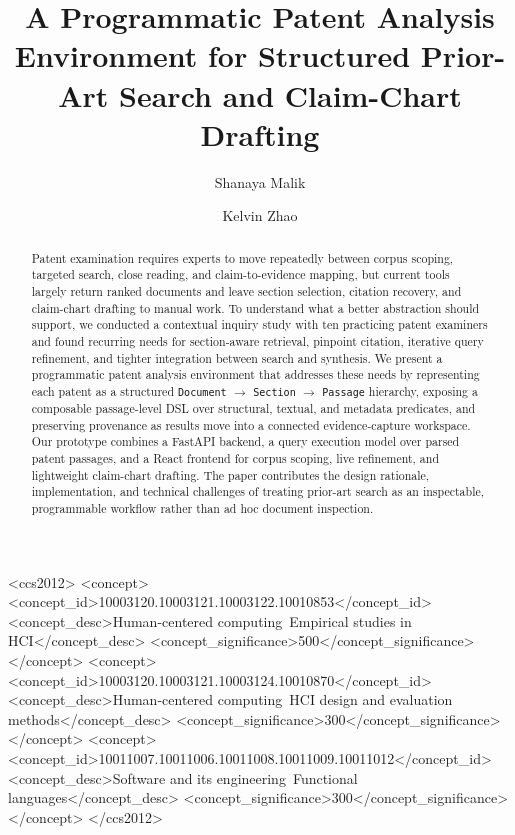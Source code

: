 \documentclass[sigconf]{acmart}
\newcommand{\DocSectionPassage}{\texttt{Document} $\to$ \texttt{Section} $\to$ \texttt{Passage}}
\begin{document}
\title{A Programmatic Patent Analysis Environment for Structured Prior-Art Search and Claim-Chart Drafting}

\author{Shanaya Malik}

\author{Kelvin Zhao}

\renewcommand{\shortauthors}{Malik \& Zhao}

\begin{abstract}
Patent examination requires experts to move repeatedly between corpus scoping,
targeted search, close reading, and claim-to-evidence mapping, but current
tools largely return ranked documents and leave section selection, citation
recovery, and claim-chart drafting to manual work. To understand what a better
abstraction should support, we conducted a contextual inquiry study with ten
practicing patent examiners and found recurring needs for section-aware
retrieval, pinpoint citation, iterative query refinement, and tighter
integration between search and synthesis. We present a programmatic patent
analysis environment that addresses these needs by representing each patent as
a structured \DocSectionPassage{} hierarchy,
exposing a composable passage-level DSL over structural, textual, and metadata
predicates, and preserving provenance as results move into a connected
evidence-capture workspace. Our prototype combines a FastAPI backend, a query
execution model over parsed patent passages, and a React frontend for corpus
scoping, live refinement, and lightweight claim-chart drafting. The paper
contributes the design rationale, implementation, and technical challenges of
treating prior-art search as an inspectable, programmable workflow rather than
ad hoc document inspection.
\end{abstract}

\begin{CCSXML}
<ccs2012>
 <concept>
  <concept_id>10003120.10003121.10003122.10010853</concept_id>
  <concept_desc>Human-centered computing~Empirical studies in HCI</concept_desc>
  <concept_significance>500</concept_significance>
 </concept>
 <concept>
  <concept_id>10003120.10003121.10003124.10010870</concept_id>
  <concept_desc>Human-centered computing~HCI design and evaluation methods</concept_desc>
  <concept_significance>300</concept_significance>
 </concept>
 <concept>
  <concept_id>10011007.10011006.10011008.10011009.10011012</concept_id>
  <concept_desc>Software and its engineering~Functional languages</concept_desc>
  <concept_significance>300</concept_significance>
 </concept>
</ccs2012>
\end{CCSXML}
\end{document}
